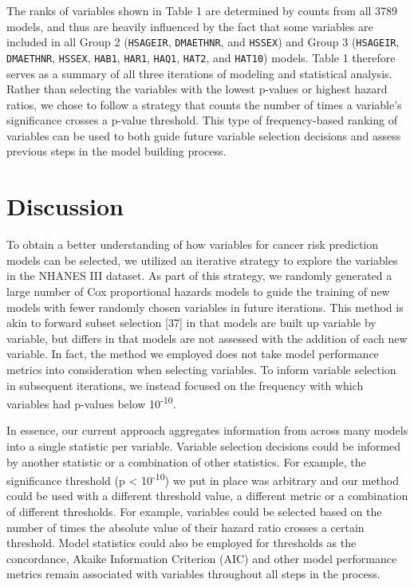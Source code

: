 \documentclass[12pt,oneside]{reedthesis}
\theoremstyle{definition}
\theoremstyle{definition}
\theoremstyle{definition}
\theoremstyle{remark}
\begin{document}
The ranks of variables shown in Table 1 are determined by counts from
all 3789 models, and thus are heavily influenced by the fact that some
variables are included in all Group 2 (\texttt{HSAGEIR},
\texttt{DMAETHNR}, and \texttt{HSSEX}) and Group 3 (\texttt{HSAGEIR},
\texttt{DMAETHNR}, \texttt{HSSEX}, \texttt{HAB1}, \texttt{HAR1},
\texttt{HAQ1}, \texttt{HAT2}, and \texttt{HAT10}) models. Table 1
therefore serves as a summary of all three iterations of modeling and
statistical analysis. Rather than selecting the variables with the
lowest p-values or highest hazard ratios, we chose to follow a strategy
that counts the number of times a variable's significance crosses a
p-value threshold. This type of frequency-based ranking of variables can
be used to both guide future variable selection decisions and assess
previous steps in the model building process.

\hypertarget{discussion}{%
\section*{Discussion}\label{discussion}}

To obtain a better understanding of how variables for cancer risk
prediction models can be selected, we utilized an iterative strategy to
explore the variables in the NHANES III dataset. As part of this
strategy, we randomly generated a large number of Cox proportional
hazards models to guide the training of new models with fewer randomly
chosen variables in future iterations. This method is akin to forward
subset selection {[}37{]} in that models are built up variable by
variable, but differs in that models are not assessed with the addition
of each new variable. In fact, the method we employed does not take
model performance metrics into consideration when selecting variables.
To inform variable selection in subsequent iterations, we instead
focused on the frequency with which variables had p-values below
10\textsuperscript{-10}.

In essence, our current approach aggregates information from across many
models into a single statistic per variable. Variable selection
decisions could be informed by another statistic or a combination of
other statistics. For example, the significance threshold (p \textless{}
10\textsuperscript{-10}) we put in place was arbitrary and our method
could be used with a different threshold value, a different metric or a
combination of different thresholds. For example, variables could be
selected based on the number of times the absolute value of their hazard
ratio crosses a certain threshold. Model statistics could also be
employed for thresholds as the concordance, Akaike Information Criterion
(AIC) and other model performance metrics remain associated with
variables throughout all steps in the process.
\end{document}
